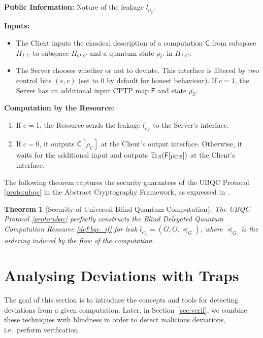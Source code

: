 \documentclass[12pt]{iopart}
\newcommand{\cptp}[1]{\mathsf{#1}} \newcommand{\pd}[1]{\mathcal{#1}}  \newcommand{\sch}[1]{\bm{#1}}
\renewcommand{\1}{\mathds{1}}
\newtheorem{theorem}{Theorem}
\begin{document}
\begin{resource}[ht]
\caption{Blind Delegated Quantum Computation}
\label{def:bqc_if}
\begin{algorithmic}[0]

\STATE \textbf{Public Information:} Nature of the leakage $l_{\rho_C}$.

\STATE \textbf{Inputs:} 
\begin{itemize}
\item The Client inputs the classical description of a computation $\cptp C$ from subspace $\Pi_{I,C}$ to subspace $\Pi_{O,C}$ and a quantum state $\rho_C$ in $\Pi_{I,C}$.
\item The Server chooses whether or not to deviate. This interface is filtered by two control bits $(e, c)$ (set to $0$ by default for honest behaviour). If $c = 1$, the Server has an additional input CPTP map $\cptp F$ and state $\rho_S$.
\end{itemize}

\STATE \textbf{Computation by the Resource:}
\begin{enumerate}
\item If $e = 1$, the Resource sends the leakage $l_{\rho_C}$ to the Server's interface.
\item If $c = 0$, it outputs $\cptp{C}[\rho_C]$ at the Client's output interface. Otherwise, it waits for the additional input and outputs $\Tr_S(\cptp F[\rho_{CS}])$ at the Client's interface.
\end{enumerate}

\end{algorithmic}
\end{resource}

The following theorem captures the security guarantees of the UBQC Protocol \ref{proto:ubqc} in the Abstract Cryptography Framework, as expressed in \cite{DFPR14:composable}.

\begin{theorem}[Security of Universal Blind Quantum Computation]
\label{thm:sec-ubqc}
The UBQC Protocol \ref{proto:ubqc} perfectly constructs the Blind Delegated Quantum Computation Resource \ref{def:bqc_if} for leak $l_{\rho_C} = (G, O, \preceq_G)$, where $\preceq_G$ is the ordering induced by the flow of the computation.
\end{theorem}
 


\section{Analysing Deviations with Traps}
\label{sec:detect}
The goal of this section is to introduce the concepts and tools for detecting deviations from a given computation.
Later, in Section~\ref{sec:verif}, we combine these techniques with blindness in order to detect malicious deviations, i.e.~perform verification.
\end{document}
